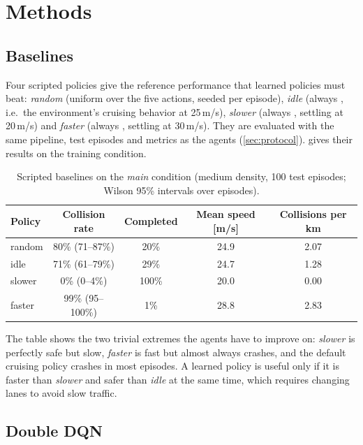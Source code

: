 \section{Methods}\label{sec:methods}

\subsection{Baselines}\label{sec:baseline}
Four scripted policies give the reference performance that learned policies must beat: \emph{random} (uniform over the
five actions, seeded per episode), \emph{idle} (always , i.e.\ the environment's cruising behavior at
25\,m/s), \emph{slower} (always , settling at 20\,m/s) and \emph{faster} (always , settling at
30\,m/s). They are evaluated with the same pipeline, test episodes and metrics as the agents (\cref{sec:protocol}).
 gives their results on the training condition.

\begin{table}[H]
  \centering
  \small
  \caption{Scripted baselines on the \emph{main} condition (medium density, 100 test episodes; Wilson 95\% intervals
  over episodes).}
  \label{tab:baselines}
  \begin{tabular}{@{}lcccc@{}}
    \toprule
    Policy & Collision rate & Completed & Mean speed [m/s] & Collisions per km \\
    \midrule
    random & 80\% (71--87\%) & 20\%  & 24.9 & 2.07 \\
    idle   & 71\% (61--79\%) & 29\%  & 24.7 & 1.28 \\
    slower & 0\% (0--4\%)    & 100\% & 20.0 & 0.00 \\
    faster & 99\% (95--100\%) & 1\%  & 28.8 & 2.83 \\
    \bottomrule
  \end{tabular}
\end{table}

The table shows the two trivial extremes the agents have to improve on: \emph{slower} is perfectly safe but slow,
\emph{faster} is fast but almost always crashes, and the default cruising policy crashes in most episodes. A learned
policy is useful only if it is faster than \emph{slower} and safer than \emph{idle} at the same time, which requires
changing lanes to avoid slow traffic.

\subsection{Double DQN}\label{sec:ddqn}

